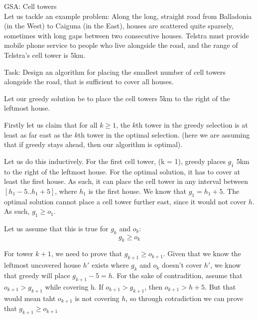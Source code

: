 \documentclass[journal, letterpaper]{IEEEtran}
\begin{document}
\begin{example}{GSA: Cell towers}\\
    Let us tackle an example problem: Along the long, straight road from Balladonia (in the West) to Caiguna (in the
    East), houses are scattered quite sparsely, sometimes with long gaps between two consecutive
    houses. Telstra must provide mobile phone service to people who live alongside the road, and
    the range of Telstra’s cell tower is 5km.

    Task: Design an algorithm for placing the smallest number of cell towers alongside the road,
    that is sufficient to cover all houses.

    Let our greedy solution be to place the cell towers 5km to the right of the leftmost
    house.

    Firstly let us claim that for all $k \geq 1$, the $k$th tower in the greedy selection
    is at least as far east as the $k$th tower in the optimal selection. (here we are
    assuming that if greedy stays ahead, then our algorithm is optimal).

    Let us do this inductively. For the first cell tower, (k = 1), greedy places $g_1$ 5km
    to the right of the leftmost house. For the optimal solution, it has to cover at least
    the first house. As such, it can place the cell tower in any interval between $[h_1 -
    5.. h_1 + 5]$, where $h_1$ is the first house. We know that $g_1 = h_1 + 5$. The
    optimal solution cannot place a cell tower further east, since it would not cover $h$.
    As such, $g_1 \geq o_1$.

    Let us assume that this is true for $g_k$ and $o_k$: $$g_k \geq o_k$$

    For tower $k + 1$, we need to prove that $g_{k+1} \geq o_{k+1}$. Given that we know
    the leftmost uncovered house $h'$ exists where $g_k$ and $o_k$ doesn't cover $h'$, we
    know that greedy will place $g_{k+1} -5 = h$. For the sake of contradition, assume
    that $o_{k+1} > g_{k+1}$ while covering h. If $o_{k+1} > g_{k+1}$, then $o_{k+1} > h +
    5$. But that would mean taht $o_{k+1}$ is not covering $h$, so through cotradiction we
    can prove that $g_{k+1} \geq o_{k+1}$
\end{example}
\end{document}
